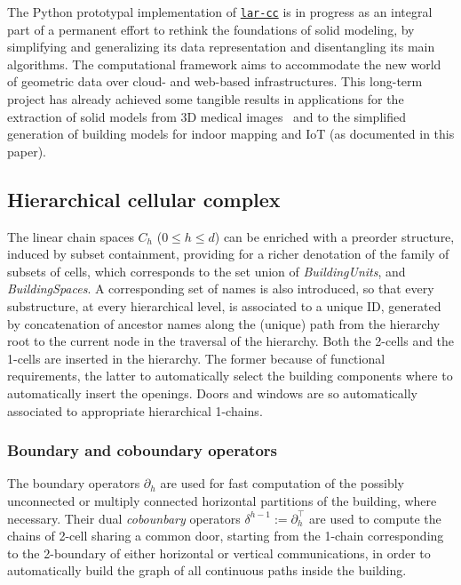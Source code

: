 \documentclass[]{egpubl}
\begin{document}
The Python prototypal implementation of \href{https://github.com/cvdlab/lar-cc}{\texttt{lar-cc}} is in progress as an integral part of a permanent effort to rethink the foundations of solid modeling, by simplifying and generalizing its data representation and disentangling its main algorithms. The computational framework aims to accommodate the new world of geometric data over cloud- and web-based infrastructures. This long-term project has already achieved some tangible results in applications for the extraction of solid models from 3D medical images~\cite{cadanda:2015} and to the simplified generation of building models for indoor mapping and IoT (as documented in this paper). 


\subsection{Hierarchical cellular complex}

The linear chain spaces $C_h$ ($0\leq h\leq d$) can be enriched with a preorder structure, induced by subset containment, providing for a richer denotation of the family of subsets of cells, which  corresponds to the set union of \emph{BuildingUnits}, and \emph{BuildingSpaces}. A corresponding set of names is also introduced, so that every substructure, at every hierarchical level, is associated to a unique ID, generated by concatenation of ancestor names along the (unique) path from the hierarchy root to the current node in the traversal of the hierarchy.  Both the 2-cells and the 1-cells are inserted in the hierarchy. The former because of functional requirements, the latter to automatically select the building components where to automatically insert the openings. Doors and windows are so automatically associated to appropriate hierarchical 1-chains. 

\subsubsection*{Boundary and coboundary operators}

The boundary operators $\partial_h$ are used for fast computation of the possibly unconnected or multiply connected horizontal partitions of the building, where necessary. 
Their dual \emph{cobounbary} operators $\delta^{h-1} := \partial_h^\top$ are used to compute the chains of 2-cell sharing a common door, starting from the 1-chain corresponding to the 2-boundary of either horizontal or vertical communications, in order to automatically build the graph of all continuous paths inside the building.
\end{document}
